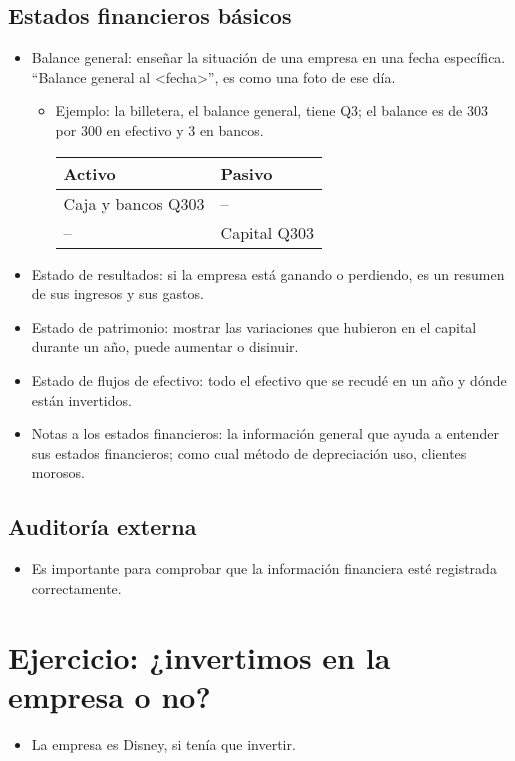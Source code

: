 \subsection{Estados financieros básicos}
\begin{itemize}
    \item Balance general: enseñar la situación de una empresa en una fecha específica. ``Balance general al <fecha>'', es como una foto de ese día.
        \begin{itemize}
            \item Ejemplo: la billetera, el balance general, tiene Q3; el balance es de 303 por 300 en efectivo y 3 en bancos.
                \begin{center}
                   \begin{tabular}{ | p{5cm} | p{5cm} | }
                       \hline
                        Activo & Pasivo     \\
                       \hline
                       Caja y bancos Q303 & -- \\ 
                       -- & Capital Q303 \\ 
                       \hline
                   \end{tabular}
                \end{center}
        \end{itemize}

    \item Estado de resultados: si la empresa está ganando o perdiendo, es un resumen de sus ingresos y sus gastos.
    \item Estado de patrimonio: mostrar las variaciones que hubieron en el capital durante un año, puede aumentar o disinuir.
    \item Estado de flujos de efectivo: todo el efectivo que se recudé en un año y dónde están invertidos. 
    \item Notas a los estados financieros: la información general que ayuda a entender sus estados financieros; como cual método de depreciación uso, clientes morosos. 
\end{itemize}

\subsection{Auditoría externa}
\begin{itemize}
    \item Es importante para comprobar que la información financiera esté registrada correctamente.
\end{itemize}

\section{Ejercicio: ¿invertimos en la empresa o no?}
\begin{itemize}
    \item La empresa es Disney, si tenía que invertir.
\end{itemize}
